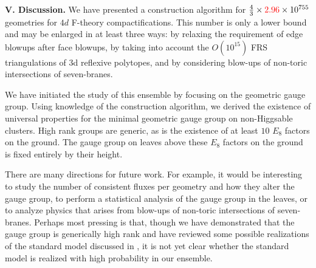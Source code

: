 \documentclass[aps,prl,twocolumn, superscriptaddress,groupedaddress,nofootinbib]{revtex4-1}
\begin{document}
\vspace{.2cm}
\noindent \textbf{V. Discussion.} 
We have presented a construction algorithm for  $\frac43 \times {\color{red} 2.96}\times
10^{755}$ geometries for $4d$ F-theory compactifications. This number is only
a lower bound and may be enlarged in at least three ways: by relaxing
the requirement of edge blowups after  face blowups, by taking into account
the $O(10^{15})$ FRS triangulations of 3d reflexive polytopes, and by
considering blow-ups of non-toric intersections of seven-branes.

We have initiated the study of this ensemble by focusing on the geometric gauge group.
Using knowledge of the construction algorithm, we derived the existence of universal
properties for the minimal geometric gauge group on non-Higgsable clusters. High
rank groups are generic, as is the existence of at least $10$ $E_8$ factors on the ground.
The gauge group on leaves above these $E_8$ factors on the ground is fixed entirely by their height.

There are many directions for future work. For example, it would be
interesting to study the number of consistent fluxes per geometry and how they alter the gauge group, to
perform a statistical analysis of the gauge group in the leaves, or to analyze
physics that arises from blow-ups of non-toric intersections of seven-branes. 
Perhaps most pressing is that, though we have demonstrated that the gauge group is generically 
high rank and have reviewed some possible realizations of the standard model discussed in \cite{Grassi:2014zxa}, it is not yet clear whether the standard model is realized with high probability in our ensemble.

\end{document}
